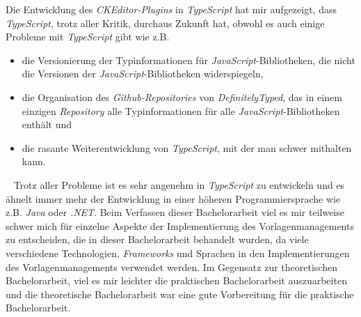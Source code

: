 \newline
\newline
Die Entwicklung des \emph{CKEditor-Plugins} in \emph{TypeScript} hat mir aufgezeigt, dass \emph{TypeScript}, trotz aller Kritik, durchaus Zukunft hat, obwohl es auch einige Probleme mit \emph{TypeScript} gibt wie z.B.
\begin{itemize}
	\item die Versionierung der Typinformationen für \emph{JavaScript}-Bibliotheken, die nicht die Versionen der \emph{JavaScript}-Bibliotheken widerspiegeln,
	\item die Organisation des \emph{Github-Repositories} von \emph{DefinitelyTyped}, das in einem einzigen \emph{Repository} alle Typinformationen für alle \emph{JavaScript}-Bibliotheken enthält und
	\item die rasante Weiterentwicklung von \emph{TypeScript}, mit der man schwer mithalten kann.
\end{itemize}
\ \newline
Trotz aller Probleme ist es sehr angenehm in \emph{TypeScript} zu entwickeln und es ähnelt immer mehr der Entwicklung in einer höheren Programmiersprache wie z.B. \emph{Java} oder \emph{.NET}.
\newline
\newline
Beim Verfassen dieser Bachelorarbeit viel es mir teilweise schwer mich für einzelne Aspekte der Implementierung des Vorlagenmanagements zu entscheiden, die in dieser Bachelorarbeit behandelt wurden, da viele verschiedene Technologien, \emph{Frameworks} und Sprachen in den Implementierungen des Vorlagenmanagements verwendet werden. Im Gegensatz zur theoretischen Bachelorarbeit, viel es mir leichter die praktischen Bachelorarbeit auszuarbeiten und die theoretische Bachelorarbeit war eine gute Vorbereitung für die praktische Bachelorarbeit.